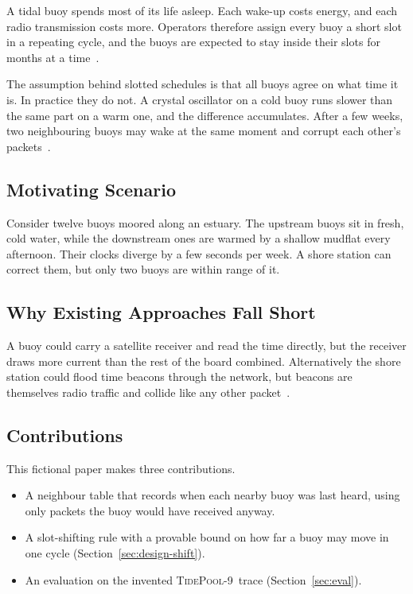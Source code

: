 \documentclass[conference]{IEEEtran}
\newcommand{\dataset}{\textsc{TidePool-9}}
\begin{document}
A tidal buoy spends most of its life asleep. Each wake-up costs energy, and each
radio transmission costs more. Operators therefore assign every buoy a short
slot in a repeating cycle, and the buoys are expected to stay inside their
slots for months at a time~\cite{okonkwo2031slots}.

The assumption behind slotted schedules is that all buoys agree on what time it
is. In practice they do not. A crystal oscillator on a cold buoy runs slower
than the same part on a warm one, and the difference accumulates. After a few
weeks, two neighbouring buoys may wake at the same moment and corrupt each
other's packets~\cite{vashti2030drift,harcourt2029coldwater}.

\subsection{Motivating Scenario}
\label{sec:intro-scenario}

Consider twelve buoys moored along an estuary. The upstream buoys sit in fresh,
cold water, while the downstream ones are warmed by a shallow mudflat every
afternoon. Their clocks diverge by a few seconds per week. A shore station can
correct them, but only two buoys are within range of it.

\subsection{Why Existing Approaches Fall Short}
\label{sec:intro-gap}

A buoy could carry a satellite receiver and read the time directly, but the
receiver draws more current than the rest of the board combined. Alternatively
the shore station could flood time beacons through the network, but beacons are
themselves radio traffic and collide like any other packet~\cite{ruiz2030beacon}.

\subsection{Contributions}
\label{sec:intro-contrib}

This fictional paper makes three contributions.
\begin{itemize}
  \item A neighbour table that records when each nearby buoy was last heard,
        using only packets the buoy would have received anyway.
  \item A slot-shifting rule with a provable bound on how far a buoy may move
        in one cycle (Section~\ref{sec:design-shift}).
  \item An evaluation on the invented \dataset\ trace
        (Section~\ref{sec:eval}).
\end{itemize}
\end{document}
